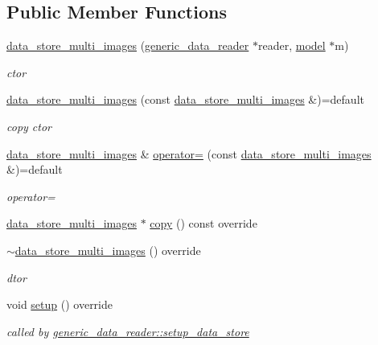 \subsection*{Public Member Functions}
\begin{DoxyCompactItemize}
\item 
\hyperlink{classlbann_1_1data__store__multi__images_a1ad4fbec5c15f98422ebf7027f3a1d8a}{data\+\_\+store\+\_\+multi\+\_\+images} (\hyperlink{classlbann_1_1generic__data__reader}{generic\+\_\+data\+\_\+reader} $\ast$reader, \hyperlink{classlbann_1_1model}{model} $\ast$m)
\begin{DoxyCompactList}\small\item\em ctor \end{DoxyCompactList}\item 
\hyperlink{classlbann_1_1data__store__multi__images_a2ef6b228164447918fb0ba831e091777}{data\+\_\+store\+\_\+multi\+\_\+images} (const \hyperlink{classlbann_1_1data__store__multi__images}{data\+\_\+store\+\_\+multi\+\_\+images} \&)=default
\begin{DoxyCompactList}\small\item\em copy ctor \end{DoxyCompactList}\item 
\hyperlink{classlbann_1_1data__store__multi__images}{data\+\_\+store\+\_\+multi\+\_\+images} \& \hyperlink{classlbann_1_1data__store__multi__images_a68962dc0416b572443953bea392439b1}{operator=} (const \hyperlink{classlbann_1_1data__store__multi__images}{data\+\_\+store\+\_\+multi\+\_\+images} \&)=default
\begin{DoxyCompactList}\small\item\em operator= \end{DoxyCompactList}\item 
\hyperlink{classlbann_1_1data__store__multi__images}{data\+\_\+store\+\_\+multi\+\_\+images} $\ast$ \hyperlink{classlbann_1_1data__store__multi__images_a1046efda9448bab9b42e9fcdf71e03f1}{copy} () const override
\item 
\hyperlink{classlbann_1_1data__store__multi__images_addafae542acaa1ef218759030719b6d3}{$\sim$data\+\_\+store\+\_\+multi\+\_\+images} () override
\begin{DoxyCompactList}\small\item\em dtor \end{DoxyCompactList}\item 
void \hyperlink{classlbann_1_1data__store__multi__images_a7b5e9ec7b7132872299a204d5d24ee62}{setup} () override
\begin{DoxyCompactList}\small\item\em called by \hyperlink{classlbann_1_1generic__data__reader_a8b2a09d38512fc11f1b9d572c89100a7}{generic\+\_\+data\+\_\+reader\+::setup\+\_\+data\+\_\+store} \end{DoxyCompactList}\end{DoxyCompactItemize}
